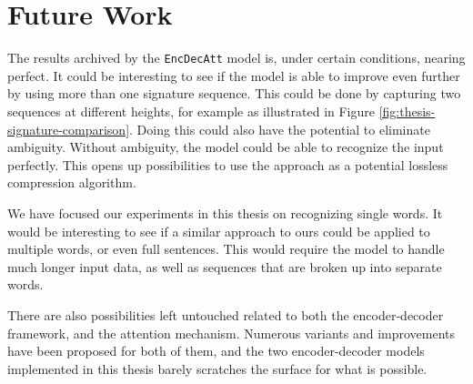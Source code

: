 
\section{Future Work}
\label{sec:future_work}
The results archived by the {\tt EncDecAtt} model is, under certain conditions, nearing perfect. It could be interesting to see if the model is able to improve even further by using more than one signature sequence. This could be done by capturing two sequences at different heights, for example as illustrated in Figure \ref{fig:thesis-signature-comparison}. Doing this could also have the potential to eliminate ambiguity. Without ambiguity, the model could be able to recognize the input perfectly. This opens up possibilities to use the approach as a potential lossless compression algorithm.

We have focused our experiments in this thesis on recognizing single words. It would be interesting to see if a similar approach to ours could be applied to multiple words, or even full sentences. This would require the model to handle much longer input data, as well as sequences that are broken up into separate words.

There are also possibilities left untouched related to both the encoder-decoder framework, and the attention mechanism. Numerous variants and improvements have been proposed for both of them, and the two encoder-decoder models implemented in this thesis barely scratches the surface for what is possible.